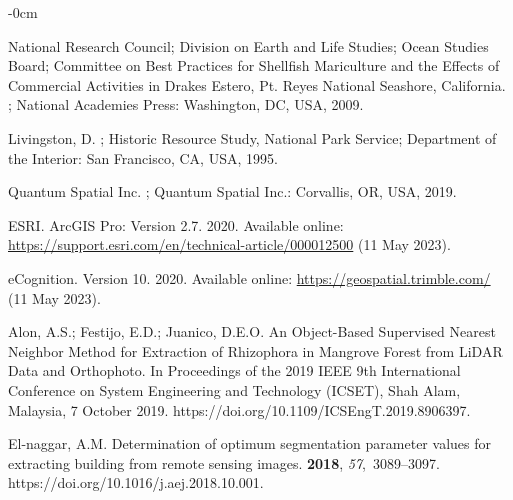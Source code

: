 \documentclass[remotesensing,article,accept,pdftex,moreauthors]{Definitions/mdpi}
\begin{document}
\begin{adjustwidth}{-\extralength}{0cm}
\begin{thebibliography}{999}
National Research Council; Division on Earth and Life Studies; Ocean Studies Board; Committee on Best Practices for Shellfish Mariculture and the Effects of Commercial Activities in Drakes Estero, Pt. Reyes National Seashore, California. %
; National Academies Press: Washington, DC, USA, 2009.

Livingston, D.
; Historic Resource Study, National Park Service;
  Department of the Interior: San Francisco, CA, USA, 1995.

Quantum Spatial Inc. %
; Quantum Spatial Inc.:
\newblock Corvallis, OR, USA, 2019.

ESRI.
\newblock ArcGIS Pro: Version 2.7. 2020. Available online: \url{https://support.esri.com/en/technical-article/000012500} (11 May 2023). %


eCognition. Version 10. 2020. Available online: \url{https://geospatial.trimble.com/} (11 May 2023). %

Alon, A.S.; Festijo, E.D.; Juanico, D.E.O.
\newblock An Object-Based Supervised Nearest Neighbor Method for Extraction of
  Rhizophora in Mangrove Forest from LiDAR Data and Orthophoto. In Proceedings of the 2019 IEEE 9th International Conference on System Engineering and Technology (ICSET), Shah Alam, Malaysia, 7 October 2019. %
\newblock https://doi.org/10.1109/ICSEngT.2019.8906397.

El-naggar, A.M.
\newblock Determination of optimum segmentation parameter values for extracting
  building from remote sensing images.
 {\bf 2018}, {\em
  57},~3089--3097. https://doi.org/10.1016/j.aej.2018.10.001.


\end{thebibliography}
\end{adjustwidth}
\end{document}
